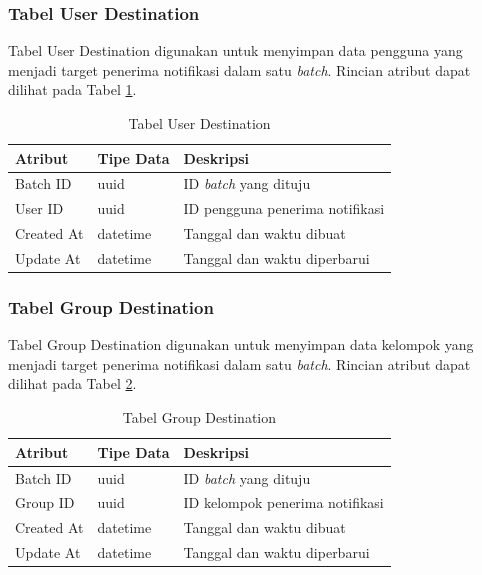 \subsubsection{Tabel User Destination}
\par Tabel User Destination digunakan untuk menyimpan data pengguna yang menjadi target penerima notifikasi dalam satu \textit{batch}. Rincian atribut dapat dilihat pada Tabel \ref{tabel_user_destination}.
\begin{longtable}{|p{2cm}|p{2.5cm}|p{4.5cm}|}
	\caption{Tabel User Destination} \label{tabel_user_destination} \\ \hline
    {Atribut} & {Tipe Data} & {Deskripsi} \\ \hline
    Batch ID & uuid & ID \textit{batch} yang dituju \\ \hline
    User ID & uuid & ID pengguna penerima notifikasi \\ \hline
    Created At & datetime & Tanggal dan waktu dibuat \\ \hline
    Update At & datetime & Tanggal dan waktu diperbarui \\ \hline
\end{longtable}

\subsubsection{Tabel Group Destination}
\par Tabel Group Destination digunakan untuk menyimpan data kelompok yang menjadi target penerima notifikasi dalam satu \textit{batch}. Rincian atribut dapat dilihat pada Tabel \ref{tabel_group_destination}.
\begin{longtable}{|p{2cm}|p{2.5cm}|p{4.5cm}|}
	\caption{Tabel Group Destination} \label{tabel_group_destination} \\ \hline
    {Atribut} & {Tipe Data} & {Deskripsi} \\ \hline
    Batch ID & uuid & ID \textit{batch} yang dituju \\ \hline
    Group ID & uuid & ID kelompok penerima notifikasi \\ \hline
    Created At & datetime & Tanggal dan waktu dibuat \\ \hline
    Update At & datetime & Tanggal dan waktu diperbarui \\ \hline
\end{longtable}

